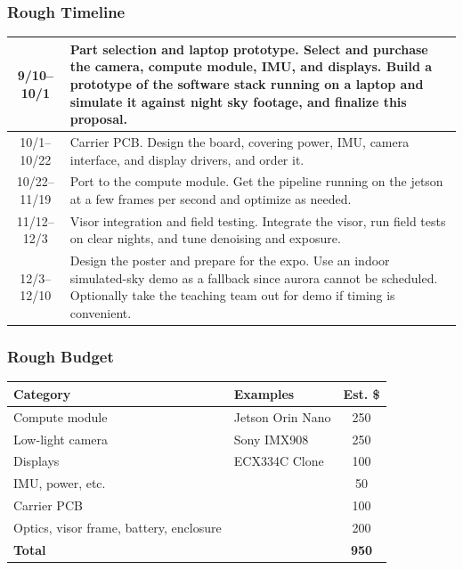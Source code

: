 \documentclass[11pt]{article}
\begin{document}
\subsubsection*{Rough Timeline}

\begin{center}
\small
\begin{tabular}{|c|p{13.5cm}|}
\hline
9/10--10/1 & Part selection and laptop prototype. Select and purchase the camera, compute module, IMU, and displays. Build a prototype of the software stack running on a laptop and simulate it against night sky footage, and finalize this proposal. \\
\hline
10/1--10/22 & Carrier PCB. Design the board, covering power, IMU, camera interface, and display drivers, and order it. \\
\hline
10/22--11/19 & Port to the compute module. Get the pipeline running on the jetson at a few frames per second and optimize as needed. \\
\hline
11/12--12/3 & Visor integration and field testing. Integrate the visor, run field tests on clear nights, and tune denoising and exposure. \\
\hline
12/3--12/10 & Design the poster and prepare for the expo. Use an indoor simulated-sky demo as a fallback since aurora cannot be scheduled. Optionally take the teaching team out for demo if timing is convenient. \\
\hline
\end{tabular}
\end{center}

\subsubsection*{Rough Budget}

\begin{center}
\small
\begin{tabular}{p{6.5cm} p{5.5cm} c}
\hline
Category & Examples & Est. \$ \\
\hline
Compute module & Jetson Orin Nano & 250 \\
Low-light camera & Sony IMX908 & 250 \\
Displays & ECX334C Clone & 100\footnotemark \\
IMU, power, etc. & & 50 \\
Carrier PCB & & 100 \\
Optics, visor frame, battery, enclosure & & 200 \\
\hline
\textbf{Total} & & \textbf{950} \\
\hline
\end{tabular}
\end{center}
\end{document}
